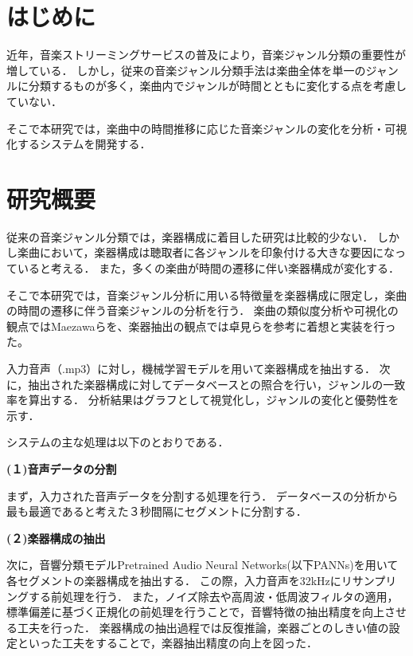 

\section{はじめに}
近年，音楽ストリーミングサービスの普及により，音楽ジャンル分類の重要性が増している．
しかし，従来の音楽ジャンル分類手法は楽曲全体を単一のジャンルに分類するものが多く，楽曲内でジャンルが時間とともに変化する点を考慮していない．

そこで本研究では，楽曲中の時間推移に応じた音楽ジャンルの変化を分析・可視化するシステムを開発する．


\section{研究概要}
従来の音楽ジャンル分類では，楽器構成に着目した研究は比較的少ない．
しかし楽曲において，楽器構成は聴取者に各ジャンルを印象付ける大きな要因になっていると考える．
また，多くの楽曲が時間の遷移に伴い楽器構成が変化する．

そこで本研究では，音楽ジャンル分析に用いる特徴量を楽器構成に限定し，楽曲の時間の遷移に伴う音楽ジャンルの分析を行う．
楽曲の類似度分析や可視化の観点ではMaezawaら\cite{maezawa}を、楽器抽出の観点では卓見ら\cite{takumi}を参考に着想と実装を行った。

入力音声（.mp3）に対し，機械学習モデルを用いて楽器構成を抽出する．
次に，抽出された楽器構成に対してデータベースとの照合を行い，ジャンルの一致率を算出する．
分析結果はグラフとして視覚化し，ジャンルの変化と優勢性を示す．

システムの主な処理は以下のとおりである．


\textbf{(１)音声データの分割}

まず，入力された音声データを分割する処理を行う．
データベースの分析から最も最適であると考えた３秒間隔にセグメントに分割する．

\textbf{(２)楽器構成の抽出}

次に，音響分類モデルPretrained Audio Neural Networks(以下PANNs)を用いて各セグメントの楽器構成を抽出する．
この際，入力音声を32kHzにリサンプリングする前処理を行う．
また，ノイズ除去や高周波・低周波フィルタの適用，標準偏差に基づく正規化の前処理を行うことで，音響特徴の抽出精度を向上させる工夫を行った．
楽器構成の抽出過程では反復推論，楽器ごとのしきい値の設定といった工夫をすることで，楽器抽出精度の向上を図った．


